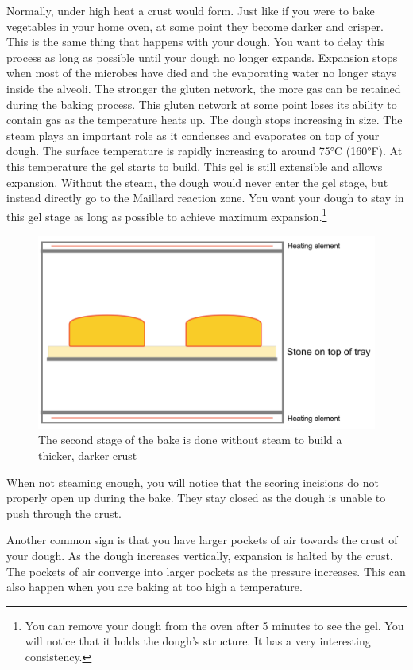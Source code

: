 Normally, under high heat a crust would form. Just like
if you were to bake vegetables in your home oven, at some point
they become darker and crisper. This is the same thing that
happens with your dough. You want to delay this process
as long as possible until your dough no longer expands.
Expansion stops when most of the microbes have died and
the evaporating water no longer stays inside the alveoli.
The stronger the gluten network, the more gas can be retained
during the baking process. This gluten network at some point
loses its ability to contain gas as the temperature heats
up. The dough stops increasing in size. The steam plays
an important role as it condenses and evaporates on top
of your dough. The surface temperature is rapidly increasing
to around 75°C (160°F). At this temperature the gel starts
to build. This gel is still extensible and allows expansion.
Without the steam, the dough would never enter the gel stage,
but instead directly go to the Maillard reaction zone. You
want your dough to stay in this gel stage as long as possible
to achieve maximum expansion.\footnote{You can remove your
dough from the oven after 5 minutes to see the gel. You will notice
that it holds the dough's structure. It has a very interesting consistency.}

\begin{figure}[!htb]
  \includegraphics[width=\textwidth]{baking-process-stage-2.jpg}
  \caption{The second stage of the bake is done without steam to build
  a thicker, darker crust}
\end{figure}

When not steaming enough, you will notice that the scoring
incisions do not properly open up during the bake. They stay
closed as the dough is unable to push through the crust.

Another common sign is that you have larger pockets
of air towards the crust of your dough. As the dough increases
vertically, expansion is halted by the crust. The pockets
of air converge into larger pockets as the pressure increases.
This can also happen when you are baking at too high a temperature.

